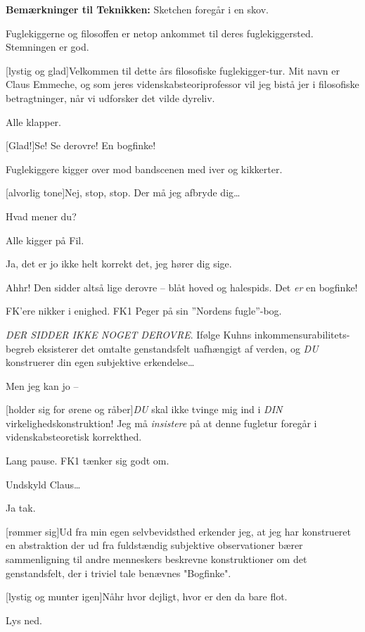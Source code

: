 \documentclass[a4paper,12pt]{article}
\begin{document}
\begin{sketch}

\scene \textbf{Bemærkninger til Teknikken:}
Sketchen foregår i en skov.


\scene Fuglekiggerne og filosoffen er netop ankommet til deres fuglekiggersted. Stemningen er god.

[lystig og glad]Velkommen til dette års filosofiske fuglekigger-tur. Mit navn er Claus Emmeche, og som jeres videnskabsteoriprofessor vil jeg bistå jer i filosofiske betragtninger, når vi udforsker det vilde dyreliv.

\scene Alle klapper.

[Glad!]Se! Se derovre! En bogfinke!

\scene Fuglekiggere kigger over mod bandscenen med iver og kikkerter.

[alvorlig tone]Nej, stop, stop. Der må jeg afbryde dig\ldots

Hvad mener du?

\scene Alle kigger på Fil.

Ja, det er jo ikke helt korrekt det, jeg hører dig sige.

Ahhr! Den sidder altså lige derovre -- blåt hoved og halespids. 
Det \emph{er} en bogfinke!

\scene FK'ere nikker i enighed. FK1 Peger på sin ''Nordens fugle''-bog.

\emph{DER SIDDER IKKE NOGET DEROVRE}. Ifølge Kuhns inkommensurabilitets-begreb eksisterer det omtalte genstandsfelt uafhængigt af verden, og \emph{DU} konstruerer din egen subjektive erkendelse\ldots {}

Men jeg kan jo --

[holder sig for ørene og råber]\emph{DU} skal ikke tvinge mig ind i \emph{DIN} virkelighedskonstruktion!  Jeg må \emph{insistere} på at denne fugletur foregår i videnskabsteoretisk korrekthed.

\scene Lang pause. FK1 tænker sig godt om.

Undskyld Claus\ldots

Ja tak.

[rømmer sig]Ud fra min egen selvbevidsthed erkender jeg, at jeg har konstrueret en abstraktion der ud fra fuldstændig subjektive observationer bærer sammenligning til andre menneskers beskrevne konstruktioner om det genstandsfelt, der i triviel tale benævnes "Bogfinke".

[lystig og munter igen]Nåhr hvor dejligt, hvor er den da bare flot.

Lys ned.

\end{sketch}
\end{document}
